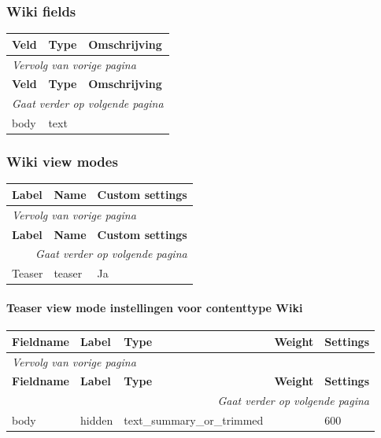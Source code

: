 \subsubsection{Wiki fields}
  \begin{longtable}{| p{5.00cm}|p{5.00cm}|p{5.00cm}|}
  \hline
  \rowcolor{tableheader}
  \textbf{Veld} & \textbf{Type} & \textbf{Omschrijving}  \tabularnewline
  \hline
\endfirsthead
\multicolumn{3}{l}{\textit{Vervolg van vorige pagina}} \\
\hline
\rowcolor{tableheader}
  \textbf{Veld} & \textbf{Type} & \textbf{Omschrijving}  \tabularnewline
  \hline
\hline
\endhead
\multicolumn{3}{r}{\textit{Gaat verder op volgende pagina}} \\
\endfoot
\hline
\endlastfoot
  body & text &   \tabularnewline
  \hline
  \end{longtable}

\subsubsection{Wiki view modes}
  \begin{longtable}{| p{5.00cm}|p{5.00cm}|p{5.00cm}|}
  \hline
  \rowcolor{tableheader}
  \textbf{Label} & \textbf{Name} & \textbf{Custom settings}  \tabularnewline
  \hline
\endfirsthead
\multicolumn{3}{l}{\textit{Vervolg van vorige pagina}} \\
\hline
\rowcolor{tableheader}
  \textbf{Label} & \textbf{Name} & \textbf{Custom settings}  \tabularnewline
  \hline
\hline
\endhead
\multicolumn{3}{r}{\textit{Gaat verder op volgende pagina}} \\
\endfoot
\hline
\endlastfoot
  Teaser & teaser & Ja  \tabularnewline
  \hline
  \end{longtable}

\paragraph{Teaser view mode instellingen voor contenttype Wiki }

  \begin{longtable}{| p{3.00cm}|p{3.00cm}|p{3.00cm}|p{3.00cm}|p{3.00cm}|}
  \hline
  \rowcolor{tableheader}
  \textbf{Fieldname} & \textbf{Label} & \textbf{Type} & \textbf{Weight} & \textbf{Settings}  \tabularnewline
  \hline
\endfirsthead
\multicolumn{5}{l}{\textit{Vervolg van vorige pagina}} \\
\hline
\rowcolor{tableheader}
  \textbf{Fieldname} & \textbf{Label} & \textbf{Type} & \textbf{Weight} & \textbf{Settings}  \tabularnewline
  \hline
\hline
\endhead
\multicolumn{5}{r}{\textit{Gaat verder op volgende pagina}} \\
\endfoot
\hline
\endlastfoot
  body & hidden & text\_summary\_or\_trimmed &   & 600  \tabularnewline
  \hline
  \end{longtable}
